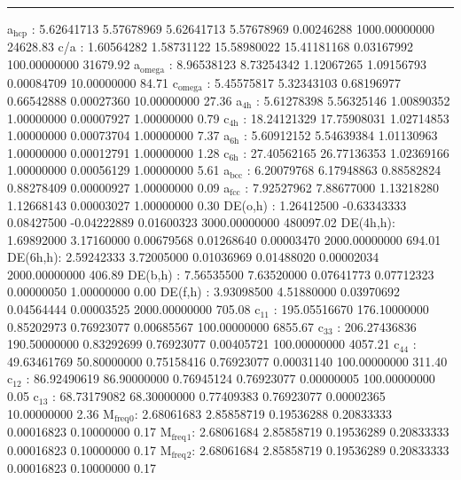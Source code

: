 \documentclass[11pt]{article}
\begin{document}
\noindent\rule{\textwidth}{0.5pt}
a\(_{\text{hcp}}\)   :   5.62641713   5.57678969   5.62641713   5.57678969   0.00246288 1000.00000000     24628.83
c/a     :   1.60564282   1.58731122  15.58980022  15.41181168   0.03167992 100.00000000     31679.92
a\(_{\text{omega}}\) :   8.96538123   8.73254342   1.12067265   1.09156793   0.00084709  10.00000000        84.71
c\(_{\text{omega}}\) :   5.45575817   5.32343103   0.68196977   0.66542888   0.00027360  10.00000000        27.36
a\(_{\text{4h}}\)    :   5.61278398   5.56325146   1.00890352   1.00000000   0.00007927   1.00000000         0.79
c\(_{\text{4h}}\)    :  18.24121329  17.75908031   1.02714853   1.00000000   0.00073704   1.00000000         7.37
a\(_{\text{6h}}\)    :   5.60912152   5.54639384   1.01130963   1.00000000   0.00012791   1.00000000         1.28
c\(_{\text{6h}}\)    :  27.40562165  26.77136353   1.02369166   1.00000000   0.00056129   1.00000000         5.61
a\(_{\text{bcc}}\)   :   6.20079768   6.17948863   0.88582824   0.88278409   0.00000927   1.00000000         0.09
a\(_{\text{fcc}}\)   :   7.92527962   7.88677000   1.13218280   1.12668143   0.00003027   1.00000000         0.30
DE(o,h) :   1.26412500  -0.63343333   0.08427500  -0.04222889   0.01600323 3000.00000000    480097.02
DE(4h,h):   1.69892000   3.17160000   0.00679568   0.01268640   0.00003470 2000.00000000       694.01
DE(6h,h):   2.59242333   3.72005000   0.01036969   0.01488020   0.00002034 2000.00000000       406.89
DE(b,h) :   7.56535500   7.63520000   0.07641773   0.07712323   0.00000050   1.00000000         0.00
DE(f,h) :   3.93098500   4.51880000   0.03970692   0.04564444   0.00003525 2000.00000000       705.08
c\(_{\text{11}}\)    : 195.05516670 176.10000000   0.85202973   0.76923077   0.00685567 100.00000000      6855.67
c\(_{\text{33}}\)    : 206.27436836 190.50000000   0.83292699   0.76923077   0.00405721 100.00000000      4057.21
c\(_{\text{44}}\)    :  49.63461769  50.80000000   0.75158416   0.76923077   0.00031140 100.00000000       311.40
c\(_{\text{12}}\)    :  86.92490619  86.90000000   0.76945124   0.76923077   0.00000005 100.00000000         0.05
c\(_{\text{13}}\)    :  68.73179082  68.30000000   0.77409383   0.76923077   0.00002365  10.00000000         2.36
M\(_{\text{freq}}\)\(_{\text{0}}\):   2.68061683   2.85858719   0.19536288   0.20833333   0.00016823   0.10000000         0.17
M\(_{\text{freq}}\)\(_{\text{1}}\):   2.68061684   2.85858719   0.19536289   0.20833333   0.00016823   0.10000000         0.17
M\(_{\text{freq}}\)\(_{\text{2}}\):   2.68061684   2.85858719   0.19536289   0.20833333   0.00016823   0.10000000         0.17
\end{document}
